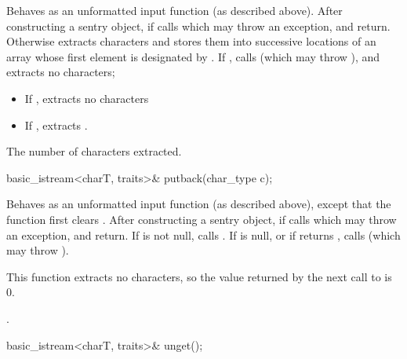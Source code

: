 \begin{itemdescr}
\pnum
\effects
Behaves as an unformatted input function (as described above).
After constructing
a sentry object, if
calls
which may throw an exception,
and return.
Otherwise extracts characters and stores them
into successive locations of an array whose first element is designated by
.
If
,
calls
(which may throw
),
and extracts no characters;
\begin{itemize}
\item
If
,
extracts no characters
\item
If
,
extracts
.
\end{itemize}

\pnum
\returns
The number of characters extracted.
\end{itemdescr}

%
\begin{itemdecl}
basic_istream<charT, traits>& putback(char_type c);
\end{itemdecl}

\begin{itemdescr}
\pnum
\effects
Behaves as an unformatted input function (as described above), except that the function first clears .
After constructing
a sentry object, if
calls
which may throw an exception,
and return.
If
is not null, calls
.
If
is null, or if
returns
,
calls
(which may throw
).
\begin{note}
This
function extracts no characters, so the value returned by the next call to
is 0.
\end{note}

\pnum
\returns
{}.
\end{itemdescr}

%
\begin{itemdecl}
basic_istream<charT, traits>& unget();
\end{itemdecl}

